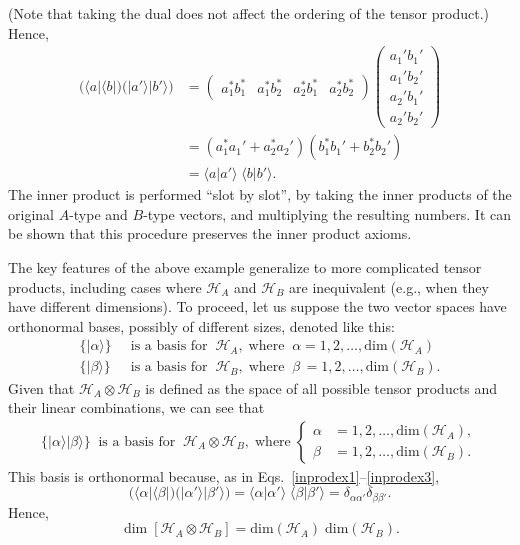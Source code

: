 \documentclass[pra,12pt]{revtex4-2}
\begin{document}
(Note that taking the dual does not affect the ordering of the tensor
product.)  Hence,
\begin{align}
  \Big(\langle a| \langle b|\Big)
  \Big(|a'\rangle |b'\rangle\Big)
  &= \begin{pmatrix} a_1^* b_1^* & a_1^* b_2^*
    & a_2^* b_1^* & a_2^* b_2^* \end{pmatrix}
  \begin{pmatrix} a_1' b_1' \\ a_1' b_2' \\
    a_2' b_1' \\ a_2' b_2' \end{pmatrix} \label{inprodex1}\\
  &= (a_1^*a_1' + a_2^*a_2') (b_1^*b_1' + b_2^*b_2') \\
  &= \langle a|a'\rangle \; \langle b|b'\rangle.  
  \label{inprodex3}
\end{align}
The inner product is performed ``slot by slot'', by taking the inner
products of the original $A$-type and $B$-type vectors, and
multiplying the resulting numbers.  It can be shown that this
procedure preserves the inner product axioms.

The key features of the above example generalize to more complicated
tensor products, including cases where $\mathscr{H}_A$ and
$\mathscr{H}_B$ are inequivalent (e.g., when they have different
dimensions).  To proceed, let us suppose the two vector spaces have
orthonormal bases, possibly of different sizes, denoted like this:
\begin{align}
  \Big\{ |\alpha\rangle \Big\} &\;\;\textrm{is a basis for}\;\; \mathscr{H}_A,
  \;\mathrm{where}\;\; \alpha = 1, 2, \dots, \mathrm{dim}(\mathscr{H}_A)\\
  \Big\{ |\beta\rangle \Big\} &\;\; \textrm{is a basis for}\;\; \mathscr{H}_B,
  \;\mathrm{where}\;\; \beta\, = 1, 2, \dots, \mathrm{dim}(\mathscr{H}_B).
\end{align}
Given that $\mathscr{H}_A \otimes \mathscr{H}_B$ is defined as the
space of all possible tensor products and their linear combinations,
we can see that
\begin{align}
  \Big\{ |\alpha \rangle |\beta \rangle \Big\}
  \;\;\textrm{is a basis for}\;\; \mathscr{H}_A \otimes \mathscr{H}_B,
  \;\mathrm{where}\;
  \begin{cases}
    \alpha &= 1, 2, \dots, \mathrm{dim}(\mathscr{H}_A), \\
    \beta &= 1, 2, \dots, \mathrm{dim}(\mathscr{H}_B).
  \end{cases}
\end{align}
This basis is orthonormal because, as in
Eqs.~\eqref{inprodex1}--\eqref{inprodex3},
\begin{equation}
  \Big(\langle \alpha| \langle \beta|\Big)
  \Big(|\alpha'\rangle |\beta'\rangle\Big)
  = \langle \alpha|\alpha'\rangle \; \langle \beta|\beta'\rangle
  = \delta_{\alpha\alpha'} \delta_{\beta\beta'}.
  \label{innerprod}
\end{equation}
Hence,
\begin{equation}
  \dim\left[\mathscr{H}_A \otimes \mathscr{H}_B\right]
  = \mathrm{dim}(\mathscr{H}_A)\; \mathrm{dim}(\mathscr{H}_B).
  \label{tensordim}
\end{equation}
\end{document}
